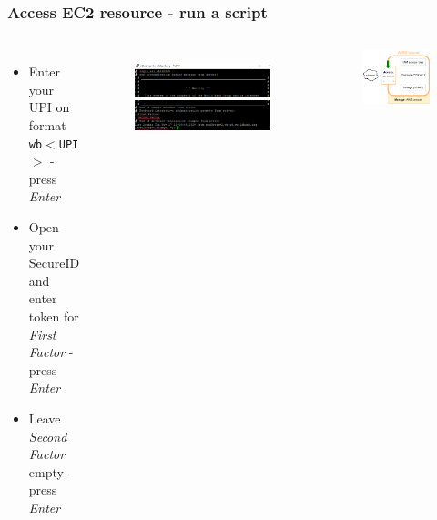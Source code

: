 \documentclass[aspectratio=169]{beamer} %
\begin{document}
\begin{frame}
	\frametitle{Access EC2 resource - run a script}
	\begin{columns}[c]
		\begin{itemize}
			\item Enter your UPI on format \texttt{wb$<$UPI$>$} - press \textit{Enter}
			\item Open your SecureID and enter token for \textit{First Factor} - press \textit{Enter}
			\item Leave \textit{Second Factor} empty - press \textit{Enter}
		\end{itemize}
	
		\begin{figure}
			\centering
			\includegraphics[width=\textwidth]{./img/access-2a.png}
			\includegraphics[width=\textwidth]{./img/access-2b.png}
		\end{figure}
		
		\begin{figure}
			\centering
			\includegraphics[width=\textwidth]{./img/wb-aws-gw.png}
		\end{figure}
		
	\end{columns}
\end{frame}
\end{document}
